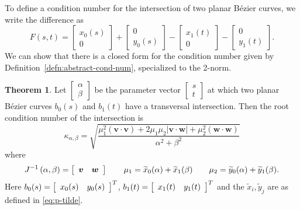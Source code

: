 \documentclass[3p, authoryear, square]{elsarticle}
\theoremstyle{definition}
\newtheorem{theorem}{Theorem}[section]
\begin{document}
To define a condition number for the intersection of two planar B\'{e}zier
curves, we write the difference as
\begin{equation}
F(s, t) = \left[ \begin{array}{c} x_0(s) \\ 0 \end{array}\right] +
  \left[ \begin{array}{c} 0 \\ y_0(s) \end{array}\right] -
  \left[ \begin{array}{c} x_1(t) \\ 0 \end{array}\right] -
  \left[ \begin{array}{c} 0 \\ y_1(t) \end{array}\right].
\end{equation}
We can show that there is a closed form for the condition number given
by Definition~\ref{defn:abstract-cond-num}, specialized to the
2-norm.

\begin{theorem}\label{thm:kappa-closed-form}
Let \(\left[\begin{array}{c} \alpha \\ \beta \end{array}\right]\) be the
parameter vector \(\left[\begin{array}{c} s \\ t \end{array}\right]\)
at which two planar B\'{e}zier curves \(b_0(s)\) and \(b_1(t)\)
have a transversal intersection.
Then the root condition number of the intersection is
\begin{equation}\label{eq:kappa-max}
\kappa_{\alpha, \beta} = \sqrt{\frac{\mu_1^2
  \left(\bm{v} \cdot \bm{v}\right) +
  2 \mu_1 \mu_2 \left|\bm{v} \cdot \bm{w}\right| +
  \mu_2^2 \left(\bm{w} \cdot \bm{w}\right)}{\alpha^2 + \beta^2}}
\end{equation}
where
\begin{equation}
  J^{-1}\left(\alpha, \beta\right) = \left[ \begin{array}{c c}
  \bm{v} & \bm{w} \end{array}\right] \qquad
  \mu_1 = \widetilde{x}_0(\alpha) + \widetilde{x}_1(\beta) \qquad
  \mu_2 = \widetilde{y}_0(\alpha) + \widetilde{y}_1(\beta).
\end{equation}
Here \(b_0(s) = \left[\begin{array}{c c} x_0(s) & y_0(s)\end{array}\right]^T\),
\(b_1(t) = \left[\begin{array}{c c} x_1(t) & y_1(t)\end{array}\right]^T\)
and the \(\widetilde{x}_i, \widetilde{y}_j\) are as defined in
\eqref{eq:p-tilde}.
\end{theorem}
\end{document}
